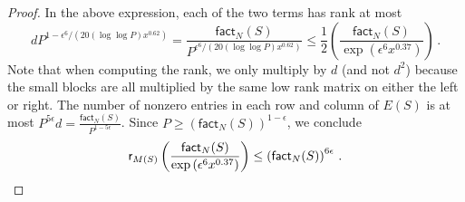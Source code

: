 \documentclass{toc}
\renewcommand\fact{\textsf{fact}}
\begin{document}
\begin{proof}
In the above expression, each of the two terms has rank at most 
\[
dP^{1 - \epsilon^6/(20(\log \log P) x^{0.62})} = \frac{\fact_N(S)}{P^{\epsilon^6/(20(\log \log P) x^{0.62})}} \leq \frac{1}{2}\left( \frac{\fact_N(S)}{\exp\left(\epsilon^6 x^{0.37}\right)} \right) \,.
\]
Note that when computing the rank, we only multiply by $d$ (and not $d^2$) because the small blocks are all multiplied by the same low rank matrix on either the left or right. The number of nonzero entries in each row and column of $E(S)$ is at most $P^{5\epsilon}d = \frac{\fact_N(S)}{P^{1-5\epsilon}}$.  Since $P \geq \left( \fact_N(S) \right)^{1 - \epsilon}$,  we conclude 
\[
\textsf{r}_{M(S)}\left( \frac{\fact_N(S)}{\exp\left(\epsilon^6 x^{0.37}\right)} \right) \leq \left(\fact_N(S)\right)^{6 \epsilon} \,. \qedhere
\]
\end{proof}
\end{document}
